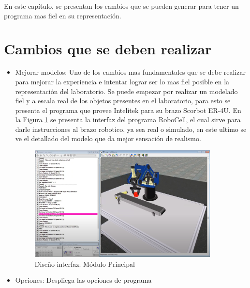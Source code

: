 En este capítulo, se presentan los cambios que se pueden generar para tener un programa mas fiel en su representación.
\section{Cambios que se deben realizar}
\begin{itemize}
    \item Mejorar modelos: Uno de los cambios mas fundamentales que se debe realizar para mejorar la experiencia e intentar lograr ser lo mas fiel posible en la representación del laboratorio.
    Se puede empezar por realizar un modelado fiel y a escala real de los objetos presentes en el laboratorio, para esto se presenta el programa que provee Intelitek para su brazo Scorbot ER-4U.
    En la Figura \ref{fig:modelo} se presenta la interfaz del programa RoboCell, el cual sirve para darle instrucciones al brazo robotico, ya sea real o simulado, en este ultimo se ve el detallado del modelo que da mejor sensación de realismo.
    \begin{figure}[h]
    \centering
    \includegraphics[height=5.82cm]{figures/modelo.png}
    \caption{Diseño interfaz: Módulo Principal}
    \label{fig:modelo}
    \end{figure}
    \item Opciones: Despliega las opciones de programa
\end{itemize}
